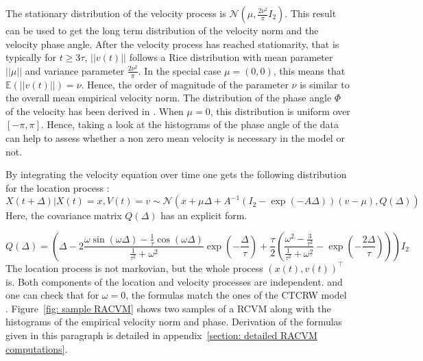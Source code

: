\documentclass[11pt]{article}
\newcommand {\E}{\mathbb{E}}
\newcommand {\1}{\mathbb{1}}
\begin{document}
The stationary distribution of the velocity process is $\mathcal{N}\left(\mu,\frac{2\nu^2}{\pi} I_2\right)$. This result can be used to get the long term distribution of the velocity norm and the velocity phase angle. After the velocity process has reached stationarity, that is typically for $t \geq 3\tau$, $\vert \vert v(t) \vert \vert$ follows a Rice distribution with mean parameter $\vert \vert \mu \vert \vert$ and variance parameter $\frac{2\nu^2}{\pi}$. In the special case $\mu=(0,0)$, this means that $\E(\vert \vert v(t) \vert \vert)=\nu$. Hence, the order of magnitude of the parameter $\nu$ is similar to the overall mean empirical velocity norm. The distribution of the phase angle $\Phi$ of the velocity has been derived in \cite{pawula_distribution_1982}.
When $\mu=0$, this distribution is uniform over $[-\pi,\pi]$. Hence, taking a look at the histograms of the phase angle of the data can help to assess whether a non zero mean velocity is necessary in the model or not.

By integrating the velocity equation over time one gets the following distribution for the location process :
\begin{equation}
	X(t+\Delta) \vert X(t)=x, V(t)=v \sim \mathcal{N}\left(x+\mu \Delta+A^{-1} \left( I_2-\exp(-A\Delta)\right)(v-\mu),Q(\Delta)\right)  
\end{equation}
Here, the covariance matrix $Q(\Delta)$ has an explicit form.

\[
	Q(\Delta)=\left( \Delta-2 \frac{\omega \sin(\omega \Delta)-\frac{1}{\tau} \cos(\omega \Delta)}{\frac{1}{\tau^2}+\omega^2 } \exp\left( -\frac{\Delta}{\tau} \right) +\frac{\tau}{2} \left( \frac{\omega^2-\frac{3}{\tau^2}}{\frac{1}{\tau^2}+\omega^2}-\exp\left( -\frac{2\Delta}{\tau}\right)\right) \right) I_2
\]
The location process is not markovian, but the whole process $(x(t), v(t))^\top$ is.
Both components of the location and velocity processes are independent.
and one can check that for $\omega=0$, the formulas match the ones of the  CTCRW model \cite{johnson_continuoustime_2008}. Figure~\ref{fig: sample RACVM} shows two samples of a RCVM along with the histograms of the empirical velocity norm and phase. Derivation of the formulas given in this paragraph is detailed in appendix~\ref{section: detailed RACVM computations}.\\



\end{document}
